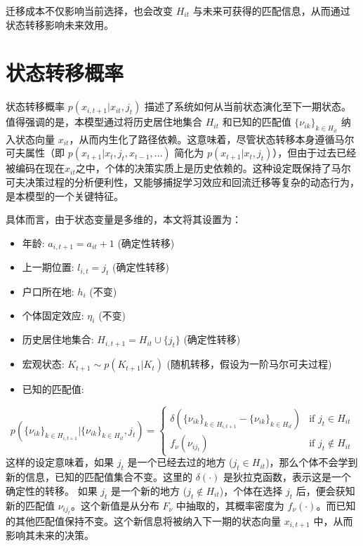 \documentclass[
  a4paper,
  zihao=-4,
  fontset=mac,
  AutoFakeBold,
  AutoFakeSlant,
  oneside]{ctexbook}
\begin{document}
迁移成本不仅影响当前选择，也会改变 $H_{it}$ 与未来可获得的匹配信息，从而通过状态转移影响未来效用。

\section{状态转移概率}



状态转移概率 $p(x_{i,t+1}|x_{it}, j_t)$ 描述了系统如何从当前状态演化至下一期状态。值得强调的是，本模型通过将历史居住地集合 $H_{it}$ 和已知的匹配值 $\{\nu_{ik}\}_{k\in H_{it}}$ 纳入状态向量 $x_{it}$，从而内生化了路径依赖。这意味着，尽管状态转移本身遵循马尔可夫属性（即 $p(x_{t+1}|x_t, j_t, x_{t-1}, \dots)$ 简化为 $p(x_{t+1}|x_t, j_t)$），但由于过去已经被编码在现在$x_{it}$之中，个体的决策实质上是历史依赖的。这种设定既保持了马尔可夫决策过程的分析便利性，又能够捕捉学习效应和回流迁移等复杂的动态行为，是本模型的一个关键特征。


具体而言，由于状态变量是多维的，本文将其设置为：

\begin{itemize}
    \item 年龄: $a_{i,t+1} = a_{it} + 1$ (确定性转移)
    \item 上一期位置: $l_{i,t} = j_t$ (确定性转移)
    \item 户口所在地: $h_i$ (不变)
    \item 个体固定效应: $\eta_i$ (不变)
    \item 历史居住地集合: $H_{i,t+1} = H_{it} \cup \{j_t\}$ (确定性转移)
    \item 宏观状态: $K_{t+1} \sim p(K_{t+1}|K_t)$ (随机转移，假设为一阶马尔可夫过程)
    \item 已知的匹配值: 
\end{itemize}  

$$ p(\{\nu_{ik}\}_{k \in H_{i,t+1}} | \{\nu_{ik}\}_{k \in H_{it}}, j_t) = \begin{cases} \delta(\{\nu_{ik}\}_{k \in H_{i,t+1}} - \{\nu_{ik}\}_{k \in H_{it}}) & \text{if } j_t \in H_{it} \\ f_\nu(\nu_{ij_t}) & \text{if } j_t \notin H_{it} \end{cases} $$
这样的设定意味着，如果 $j_t$ 是一个已经去过的地方 ($j_t \in H_{it}$)，那么个体不会学到新的信息，已知的匹配值集合不变。这里的 $\delta(\cdot)$ 是狄拉克函数，表示这是一个确定性的转移。
如果 $j_t$ 是一个新的地方 ($j_t \notin H_{it}$)，个体在选择 $j_t$ 后，便会获知新的匹配值 $\nu_{ij_t}$。这个新值是从分布 $F_\nu$ 中抽取的，其概率密度为 $f_\nu(\cdot)$。而已知的其他匹配值保持不变。这个新信息将被纳入下一期的状态向量 $x_{i,t+1}$ 中，从而影响其未来的决策。
\end{document}
